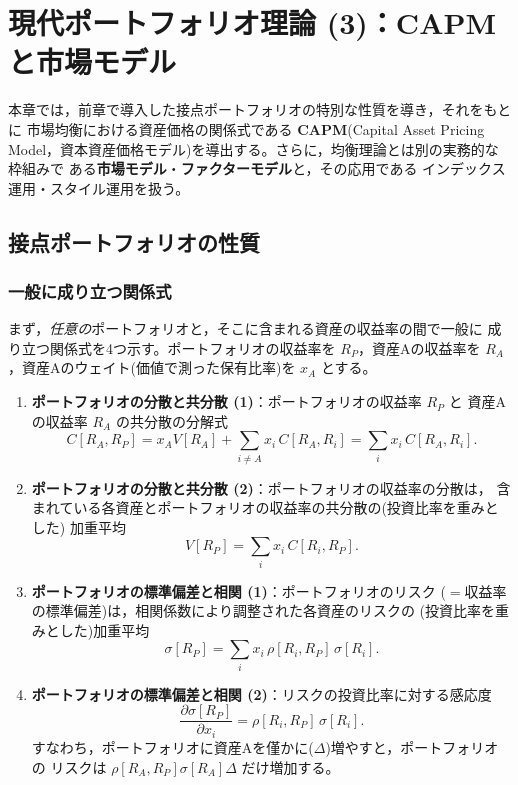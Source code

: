 \chapter{現代ポートフォリオ理論 (3)：CAPMと市場モデル}

本章では，前章で導入した接点ポートフォリオの特別な性質を導き，それをもとに
市場均衡における資産価格の関係式である \textbf{CAPM}(Capital Asset Pricing
Model，資本資産価格モデル)を導出する。さらに，均衡理論とは別の実務的な枠組みで
ある\textbf{市場モデル}・\textbf{ファクターモデル}と，その応用である
インデックス運用・スタイル運用を扱う。

\section{接点ポートフォリオの性質}

\subsection{一般に成り立つ関係式}

まず，\emph{任意の}ポートフォリオと，そこに含まれる資産の収益率の間で一般に
成り立つ関係式を4つ示す。ポートフォリオの収益率を $R_P$，資産Aの収益率を
$R_A$，資産Aのウェイト(価値で測った保有比率)を $x_A$ とする。

\begin{enumerate}
\item \textbf{ポートフォリオの分散と共分散 (1)}：ポートフォリオの収益率 $R_P$ と
資産Aの収益率 $R_A$ の共分散の分解式
\begin{equation}
C[R_A, R_P] = x_A V[R_A] + \sum_{i\neq A} x_i\, C[R_A, R_i]
= \sum_i x_i\, C[R_A, R_i].
\label{eq:rel1}
\end{equation}
\item \textbf{ポートフォリオの分散と共分散 (2)}：ポートフォリオの収益率の分散は，
含まれている各資産とポートフォリオの収益率の共分散の(投資比率を重みとした)
加重平均
\begin{equation}
V[R_P] = \sum_i x_i\, C[R_i, R_P].
\label{eq:rel2}
\end{equation}
\item \textbf{ポートフォリオの標準偏差と相関 (1)}：ポートフォリオのリスク
($=$収益率の標準偏差)は，相関係数により調整された各資産のリスクの
(投資比率を重みとした)加重平均
\begin{equation}
\sigma[R_P] = \sum_i x_i\, \rho[R_i, R_P]\,\sigma[R_i].
\label{eq:rel3}
\end{equation}
\item \textbf{ポートフォリオの標準偏差と相関 (2)}：リスクの投資比率に対する感応度
\begin{equation}
\frac{\partial\sigma[R_P]}{\partial x_i} = \rho[R_i, R_P]\,\sigma[R_i].
\label{eq:rel4}
\end{equation}
すなわち，ポートフォリオに資産Aを僅かに($\Delta$)増やすと，ポートフォリオの
リスクは $\rho[R_A,R_P]\sigma[R_A]\Delta$ だけ増加する。
\end{enumerate}

